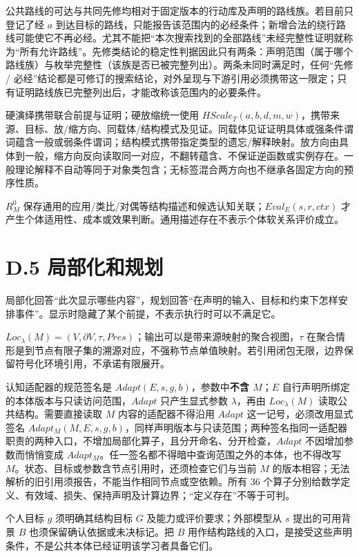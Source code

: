\documentclass[UTF8,a4paper,zihao=-4,fontset=windows,openany]{ctexbook}
\def\mathrm#1{#1}%
\begin{document}
公共路线的可达与共同先修均相对于固定版本的行动库及声明的路线族。若目前只登记了经 \(a\) 到达目标的路线，只能报告该范围内的必经条件；新增合法的绕行路线可能使它不再必经。尤其不能把“本次搜索找到的全部路线”未经完整性证明就称为“所有允许路线”。先修类结论的稳定性判据因此只有两条：声明范围（属于哪个路线族）与枚举完整性（该族是否已被完整列出）。两条未同时满足时，任何“先修 / 必经”结论都是可修订的搜索结论，对外呈现与下游引用必须携带这一限定；只有证明路线族已完整列出后，才能改称该范围内的必要条件。

硬演绎携带联合前提与证明；硬放缩统一使用 \(\mathrm{HScale}_T(a,b,d,m,w)\)，携带来源、目标、放/缩方向、同载体/结构模式及见证。同载体见证证明具体或强条件谓词蕴含一般或弱条件谓词；结构模式携带指定类型的遗忘/解释映射。放方向由具体到一般，缩方向反向读取同一对应，不翻转蕴含、不保证逆函数或实例存在。一般理论解释不自动等同于对象类包含；无标签混合两方向也不继承各固定方向的预序性质。

\(R^{0}_M\) 保存通用的应用/类比/对偶等结构描述和候选认知关联；\(\mathrm{Eval}_E(s,r,\mathrm{ctx})\) 才产生个体适用性、成本或效果判断。通用描述存在不表示个体软关系评价成立。

\section{D.5 局部化和规划}
局部化回答“此次显示哪些内容”，规划回答“在声明的输入、目标和约束下怎样安排事件”。显示时隐藏了某个前提，不表示执行时可以不满足它。

\(\mathrm{Loc}_\lambda(M)=(V,\partial V,\tau,\mathrm{Pres})\)；输出可以是带来源映射的聚合视图，\(\tau\) 在聚合情形是到节点有限子集的溯源对应，不强称节点单值映射。若引用闭包无限，边界保留符号化环境引用，不承诺有限展开。

认知适配器的规范签名是 \(\mathrm{Adapt}(E,s,g,b)\)，参数中\textbf{不含 \(M\)}；\(E\) 自行声明所绑定的本体版本与只读访问范围，\(\mathrm{Adapt}\) 只产生显式参数 \(\lambda\)，再由 \(\mathrm{Loc}_\lambda(M)\) 读取公共结构。需要直接读取 \(M\) 内容的适配器不得沿用 \(\mathrm{Adapt}\) 这一记号，必须改用显式签名 \(\mathrm{Adapt}_M(M,E,s,g,b)\)，同样声明版本与只读范围；两种签名指同一适配器职责的两种入口，不增加局部化算子，且分开命名、分开检查，\(\mathrm{Adapt}\) 不因增加参数而悄悄变成 \(\mathrm{Adapt}_M\)。任一签名都不得暗中查询范围之外的本体，也不得改写 \(M\)。状态、目标或参数含节点引用时，还须检查它们与当前 \(M\) 的版本相容；无法解析的旧引用须报告，不能当作相同节点或空依赖。所有 36 个算子分别给数学定义、有效域、损失、保持声明及计算边界；“定义存在”不等于可判。

个人目标 \(g\) 须明确其结构目标 \(G\) 及能力或评价要求；外部模型从 \(s\) 提出的可用背景 \(B\) 也须保留确认依据或未决标记。把 \(B\) 用作结构路线的入口，是接受这些声明条件，不是公共本体已经证明该学习者具备它们。
\end{document}
